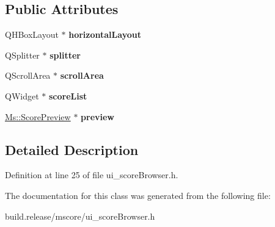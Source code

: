 \subsection*{Public Attributes}
\begin{DoxyCompactItemize}
\item 
\mbox{\label{class_ui___score_browser_af6d9f720790496ddffc16b1aec7f8ad1}} 
Q\+H\+Box\+Layout $\ast$ {\bfseries horizontal\+Layout}
\item 
\mbox{\label{class_ui___score_browser_a17da43f0c5138032ec174b91354a0574}} 
Q\+Splitter $\ast$ {\bfseries splitter}
\item 
\mbox{\label{class_ui___score_browser_a1ee6e8c522849d979c5a4f59ff8aee65}} 
Q\+Scroll\+Area $\ast$ {\bfseries scroll\+Area}
\item 
\mbox{\label{class_ui___score_browser_a164437c5da9d59ed60aec2311f06096d}} 
Q\+Widget $\ast$ {\bfseries score\+List}
\item 
\mbox{\label{class_ui___score_browser_a909d43c8f1572388108019827af3eb55}} 
\hyperlink{class_ms_1_1_score_preview}{Ms\+::\+Score\+Preview} $\ast$ {\bfseries preview}
\end{DoxyCompactItemize}


\subsection{Detailed Description}


Definition at line 25 of file ui\+\_\+score\+Browser.\+h.



The documentation for this class was generated from the following file\+:\begin{DoxyCompactItemize}
\item 
build.\+release/mscore/ui\+\_\+score\+Browser.\+h\end{DoxyCompactItemize}
